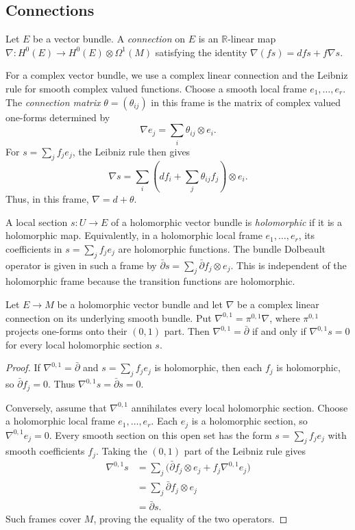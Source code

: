 \subsection{Connections}
\label{subsection-connections}

\begin{definition}
\label{definition-connection-vector-bundle}
Let $E$ be a vector bundle.
A {\it connection} on $E$ is an
$\mathbb{R}$-linear map
$\nabla:H^0(E)\to H^0(E) \otimes \Omega^1(M)$
satisfying the identity
$\nabla(fs)=dfs + f\nabla s$.
\end{definition}

\noindent
For a complex vector bundle, we use a
complex linear connection and the
Leibniz rule for smooth complex valued
functions.
Choose a smooth local frame
$e_1,\ldots,e_r$.
The {\it connection matrix}
$\theta=(\theta_{ij})$ in this frame is
the matrix of complex valued one-forms
determined by
$$
\nabla e_j=\sum_i\theta_{ij}\otimes e_i.
$$
For $s=\sum_j f_j e_j$, the Leibniz rule
then gives
$$
\nabla s
=\sum_i\left(df_i+\sum_j\theta_{ij}f_j\right)
\otimes e_i.
$$
Thus, in this frame, $\nabla=d+\theta$.

\noindent
A local section $s:U\to E$ of a
holomorphic vector bundle is
{\it holomorphic} if it is a holomorphic
map. Equivalently, in a holomorphic
local frame $e_1,\ldots,e_r$, its
coefficients in $s=\sum_j f_j e_j$ are
holomorphic functions.
The bundle Dolbeault operator is given
in such a frame by
$
\bar\partial s
=\sum_j\bar\partial f_j\otimes e_j.
$
This is independent of the holomorphic
frame because the transition functions
are holomorphic.

\begin{lemma}
\label{lemma-connection-holomorphic-sections}
Let $E\to M$ be a holomorphic vector
bundle and let $\nabla$ be a complex
linear connection on its underlying
smooth bundle. Put
$\nabla^{0,1}=\pi^{0,1}\nabla$,
where $\pi^{0,1}$ projects one-forms
onto their $(0,1)$ part.
Then $\nabla^{0,1}=\bar\partial$ if and
only if $\nabla^{0,1}s=0$ for every
local holomorphic section $s$.
\end{lemma}

\begin{proof}
If $\nabla^{0,1}=\bar\partial$ and
$s=\sum_j f_j e_j$ is holomorphic,
then each $f_j$ is holomorphic, so
$\bar\partial f_j=0$.
Thus $\nabla^{0,1}s=\bar\partial s=0$.

Conversely, assume that $\nabla^{0,1}$
annihilates every local holomorphic
section. Choose a holomorphic local
frame $e_1,\ldots,e_r$.
Each $e_j$ is a holomorphic section,
so $\nabla^{0,1}e_j=0$.
Every smooth section on this open set
has the form $s=\sum_j f_j e_j$ with
smooth coefficients $f_j$.
Taking the $(0,1)$ part of the Leibniz
rule gives
$$
\begin{aligned}
\nabla^{0,1}s
&=\sum_j\bigl(
\bar\partial f_j\otimes e_j
+f_j\nabla^{0,1}e_j\bigr)\\
&=\sum_j\bar\partial f_j\otimes e_j\\
&=\bar\partial s.
\end{aligned}
$$
Such frames cover $M$, proving the
equality of the two operators.
\end{proof}

